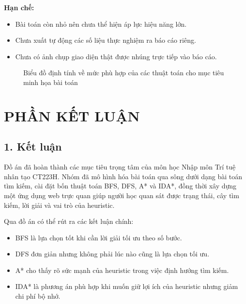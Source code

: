 \documentclass[a4paper,12pt]{article}
\begin{document}
\textbf{Hạn chế:}
\begin{itemize}
    \item Bài toán còn nhỏ nên chưa thể hiện áp lực hiệu năng lớn.
    \item Chưa xuất tự động các số liệu thực nghiệm ra báo cáo riêng.
    \item Chưa có ảnh chụp giao diện thật được nhúng trực tiếp vào báo cáo.
\end{itemize}

\begin{figure}[H]
\centering
{}
\caption{Biểu đồ định tính về mức phù hợp của các thuật toán cho mục tiêu minh họa bài toán}
\label{fig:qualitative-compare}
\end{figure}

\section*{PHẦN KẾT LUẬN}

\subsection*{1. Kết luận}

Đồ án đã hoàn thành các mục tiêu trọng tâm của môn học Nhập môn Trí tuệ nhân tạo CT223H. Nhóm đã mô hình hóa bài toán qua sông dưới dạng bài toán tìm kiếm, cài đặt bốn thuật toán BFS, DFS, A* và IDA*, đồng thời xây dựng một ứng dụng web trực quan giúp người học quan sát được trạng thái, cây tìm kiếm, lời giải và vai trò của heuristic.

Qua đồ án có thể rút ra các kết luận chính:
\begin{itemize}
    \item BFS là lựa chọn tốt khi cần lời giải tối ưu theo số bước.
    \item DFS đơn giản nhưng không phải lúc nào cũng là lựa chọn tối ưu.
    \item A* cho thấy rõ sức mạnh của heuristic trong việc định hướng tìm kiếm.
    \item IDA* là phương án phù hợp khi muốn giữ lợi ích của heuristic nhưng giảm chi phí bộ nhớ.
\end{itemize}
\end{document}

